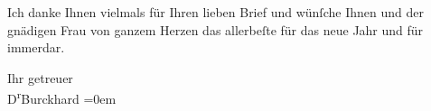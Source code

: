 \pstart
           Ich danke Ihnen vielmals für Ihren lieben Brief und wünſche Ihnen und der gnädigen
                  Frau von ganzem Herzen das
               allerbeſte für das neue Jahr und für immerdar.\pend
           
\pstart
           Ihr getreuer{\\[\baselineskip]}\spacefill\mbox{D\textsuperscript{r}Burckhard}\pend
           \leftskip=0em{}\endnumbering{}  \newcommand{\dateiname}{L01747}\newcommand{\titel}{Max Burckhard an Arthur Schnitzler, 31. 12. 1907}\newcommand{\editorInnen}{Martin Anton Müller und Gerd-Hermann Susen}
